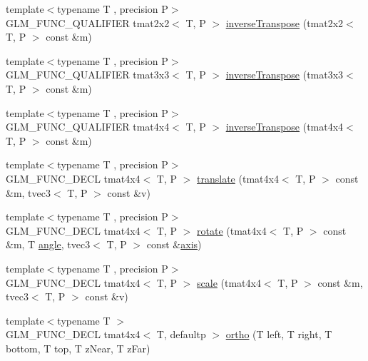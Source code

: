 \begin{DoxyCompactItemize}
\item 
{\footnotesize template$<$typename T , precision P$>$ }\\G\+L\+M\+\_\+\+F\+U\+N\+C\+\_\+\+Q\+U\+A\+L\+I\+F\+I\+E\+R tmat2x2$<$ T, P $>$ \hyperlink{namespaceglm_a926e019cbcdde3db9739b175f86b074c}{inverse\+Transpose} (tmat2x2$<$ T, P $>$ const \&m)
\item 
{\footnotesize template$<$typename T , precision P$>$ }\\G\+L\+M\+\_\+\+F\+U\+N\+C\+\_\+\+Q\+U\+A\+L\+I\+F\+I\+E\+R tmat3x3$<$ T, P $>$ \hyperlink{namespaceglm_a3b95ed2233ca365d49d19aea958c7f28}{inverse\+Transpose} (tmat3x3$<$ T, P $>$ const \&m)
\item 
{\footnotesize template$<$typename T , precision P$>$ }\\G\+L\+M\+\_\+\+F\+U\+N\+C\+\_\+\+Q\+U\+A\+L\+I\+F\+I\+E\+R tmat4x4$<$ T, P $>$ \hyperlink{namespaceglm_a38637490a036240e2fdcc490e7870a26}{inverse\+Transpose} (tmat4x4$<$ T, P $>$ const \&m)
\item 
{\footnotesize template$<$typename T , precision P$>$ }\\G\+L\+M\+\_\+\+F\+U\+N\+C\+\_\+\+D\+E\+C\+L tmat4x4$<$ T, P $>$ \hyperlink{group__gtc__matrix__transform_gaee134ab77c6c5548a6ebf4e8e476c6ed}{translate} (tmat4x4$<$ T, P $>$ const \&m, tvec3$<$ T, P $>$ const \&v)
\item 
{\footnotesize template$<$typename T , precision P$>$ }\\G\+L\+M\+\_\+\+F\+U\+N\+C\+\_\+\+D\+E\+C\+L tmat4x4$<$ T, P $>$ \hyperlink{group__gtc__matrix__transform_ga161b1df124348f232d994ba7958e4815}{rotate} (tmat4x4$<$ T, P $>$ const \&m, T \hyperlink{group__gtc__quaternion_gad4a4448baedb198b2b1e7880d2544dc9}{angle}, tvec3$<$ T, P $>$ const \&\hyperlink{group__gtc__quaternion_ga0b3e87a13b2708154b72259e50789a19}{axis})
\item 
{\footnotesize template$<$typename T , precision P$>$ }\\G\+L\+M\+\_\+\+F\+U\+N\+C\+\_\+\+D\+E\+C\+L tmat4x4$<$ T, P $>$ \hyperlink{group__gtc__matrix__transform_ga8f062fcc07e2445500793f2803afebb0}{scale} (tmat4x4$<$ T, P $>$ const \&m, tvec3$<$ T, P $>$ const \&v)
\item 
{\footnotesize template$<$typename T $>$ }\\G\+L\+M\+\_\+\+F\+U\+N\+C\+\_\+\+D\+E\+C\+L tmat4x4$<$ T, defaultp $>$ \hyperlink{group__gtc__matrix__transform_ga65280251de6e38580110a0577a43d8f8}{ortho} (T left, T right, T bottom, T top, T z\+Near, T z\+Far)
\item 

\end{DoxyCompactItemize}

